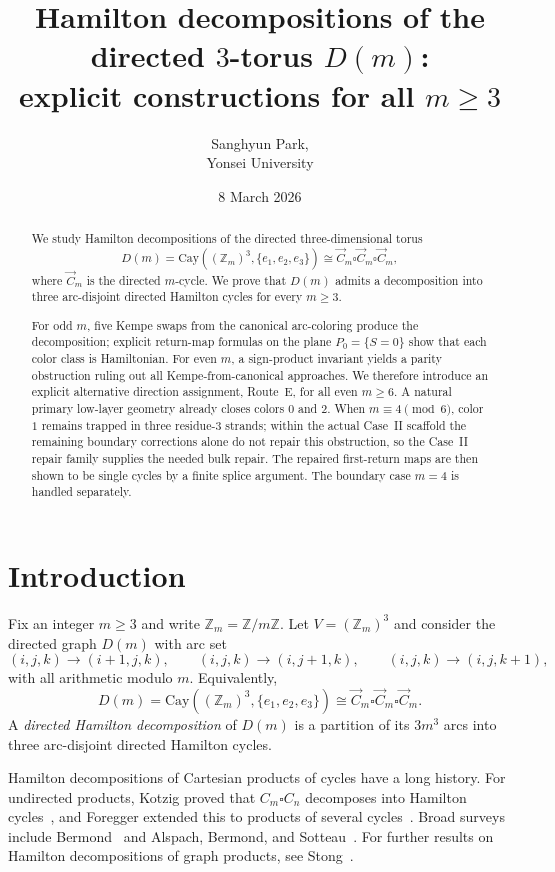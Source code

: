 \documentclass[11pt]{article}
\title{Hamilton decompositions of the directed $3$-torus $D(m)$:\\
explicit constructions for all $m\ge 3$}
\author{Sanghyun Park, \\ Yonsei University}
\date{8 March 2026}
\begin{document}
\maketitle

\begin{abstract}
We study Hamilton decompositions of the directed three-dimensional torus
\[
D(m)=\mathrm{Cay}((\mathbb Z_m)^3,\{e_1,e_2,e_3\})\cong \vec C_m\square \vec C_m\square \vec C_m,
\]
where $\vec C_m$ is the directed $m$-cycle.
We prove that $D(m)$ admits a decomposition into three arc-disjoint directed Hamilton cycles for every $m\ge 3$.

For odd $m$, five Kempe swaps from the canonical arc-coloring produce the decomposition;
explicit return-map formulas on the plane $P_0=\{S=0\}$ show that each color class is Hamiltonian.
For even $m$, a sign-product invariant yields a parity obstruction ruling out all Kempe-from-canonical approaches.
We therefore introduce an explicit alternative direction assignment, Route~E, for all even $m\ge 6$.
A natural primary low-layer geometry already closes colors $0$ and $2$.
When $m\equiv 4\pmod 6$, color $1$ remains trapped in three residue-$3$ strands;
within the actual Case~II scaffold the remaining boundary corrections alone do not repair this obstruction, so the Case~II repair family supplies the needed bulk repair.
The repaired first-return maps are then shown to be single cycles by a finite splice argument.
The boundary case $m=4$ is handled separately.
\end{abstract}


\section{Introduction}

Fix an integer $m\ge 3$ and write $\mathbb Z_m=\mathbb Z/m\mathbb Z$.
Let $V=(\mathbb Z_m)^3$ and consider the directed graph $D(m)$ with arc set
\[
(i,j,k)\to(i+1,j,k),\qquad (i,j,k)\to(i,j+1,k),\qquad (i,j,k)\to(i,j,k+1),
\]
with all arithmetic modulo $m$.
Equivalently,
\[
D(m)=\mathrm{Cay}((\mathbb Z_m)^3,\{e_1,e_2,e_3\})\cong \vec C_m\square \vec C_m\square \vec C_m.
\]
A \emph{directed Hamilton decomposition} of $D(m)$ is a partition of its $3m^3$ arcs into three arc-disjoint directed Hamilton cycles.

Hamilton decompositions of Cartesian products of cycles have a long history.
For undirected products, Kotzig proved that $C_m\square C_n$ decomposes into Hamilton cycles~\cite{Kotzig1973}, and Foregger extended this to products of several cycles~\cite{Foregger1978}.
Broad surveys include Bermond~\cite{Bermond1978} and Alspach, Bermond, and Sotteau~\cite{AlspachBermondSotteau1990}.
For further results on Hamilton decompositions of graph products, see Stong~\cite{Stong1991}.
\end{document}

